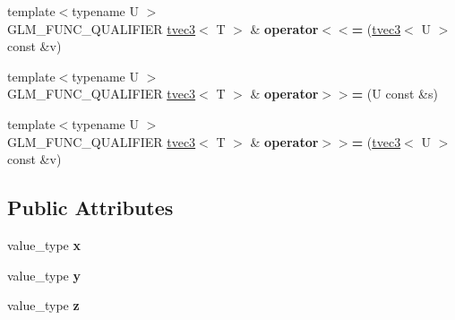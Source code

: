 \begin{DoxyCompactItemize}
\item 
\hypertarget{structglm_1_1detail_1_1tvec3_a144bc8c89483e87d194c3d8d7a18122e}{{\footnotesize template$<$typename U $>$ }\\G\-L\-M\-\_\-\-F\-U\-N\-C\-\_\-\-Q\-U\-A\-L\-I\-F\-I\-E\-R \hyperlink{structglm_1_1detail_1_1tvec3}{tvec3}$<$ T $>$ \& {\bfseries operator$<$$<$=} (\hyperlink{structglm_1_1detail_1_1tvec3}{tvec3}$<$ U $>$ const \&v)}\label{structglm_1_1detail_1_1tvec3_a144bc8c89483e87d194c3d8d7a18122e}

\item 
\hypertarget{structglm_1_1detail_1_1tvec3_a05f0c81f637dc4ac552e325d50e13cbe}{{\footnotesize template$<$typename U $>$ }\\G\-L\-M\-\_\-\-F\-U\-N\-C\-\_\-\-Q\-U\-A\-L\-I\-F\-I\-E\-R \hyperlink{structglm_1_1detail_1_1tvec3}{tvec3}$<$ T $>$ \& {\bfseries operator$>$$>$=} (U const \&s)}\label{structglm_1_1detail_1_1tvec3_a05f0c81f637dc4ac552e325d50e13cbe}

\item 
\hypertarget{structglm_1_1detail_1_1tvec3_a494d52e3813d4d463936dc09afef878e}{{\footnotesize template$<$typename U $>$ }\\G\-L\-M\-\_\-\-F\-U\-N\-C\-\_\-\-Q\-U\-A\-L\-I\-F\-I\-E\-R \hyperlink{structglm_1_1detail_1_1tvec3}{tvec3}$<$ T $>$ \& {\bfseries operator$>$$>$=} (\hyperlink{structglm_1_1detail_1_1tvec3}{tvec3}$<$ U $>$ const \&v)}\label{structglm_1_1detail_1_1tvec3_a494d52e3813d4d463936dc09afef878e}

\end{DoxyCompactItemize}
\subsection*{Public Attributes}
\begin{DoxyCompactItemize}
\item 
\hypertarget{structglm_1_1detail_1_1tvec3_a19977112bc5b09d2fe5dee031f65b350}{value\-\_\-type {\bfseries x}}\label{structglm_1_1detail_1_1tvec3_a19977112bc5b09d2fe5dee031f65b350}

\item 
\hypertarget{structglm_1_1detail_1_1tvec3_af9c969e9bc7a5e7e91db0a605be99940}{value\-\_\-type {\bfseries y}}\label{structglm_1_1detail_1_1tvec3_af9c969e9bc7a5e7e91db0a605be99940}

\item 
\hypertarget{structglm_1_1detail_1_1tvec3_ae2e43bd553ceb55d728fb20b5b10f346}{value\-\_\-type {\bfseries z}}\label{structglm_1_1detail_1_1tvec3_ae2e43bd553ceb55d728fb20b5b10f346}

\end{DoxyCompactItemize}


